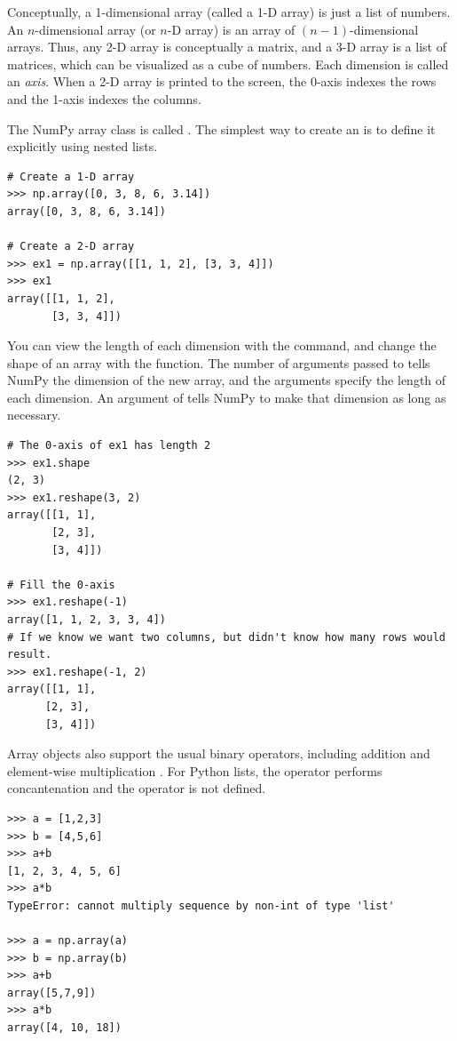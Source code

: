 Conceptually, a 1-dimensional array (called a 1-D array) is just a list of numbers. 
An $n$-dimensional array (or $n$-D array) is an array of $(n-1)$-dimensional arrays. 
Thus, any 2-D array is conceptually a matrix, and a 3-D array is a list of matrices, which can be visualized as a cube of numbers. 
Each dimension is called an \emph{axis}. 
When a 2-D array is printed to the screen, the 0-axis indexes the rows and the 1-axis indexes the columns.

The NumPy array class is called . 
The simplest way to create an  is to define it explicitly using nested lists.
\begin{lstlisting}
# Create a 1-D array
>>> np.array([0, 3, 8, 6, 3.14])
array([0, 3, 8, 6, 3.14]) 

# Create a 2-D array
>>> ex1 = np.array([[1, 1, 2], [3, 3, 4]])
>>> ex1
array([[1, 1, 2],
       [3, 3, 4]])

\end{lstlisting} 

You can view the length of each dimension with the  command, and change the shape of an array with the  function. 
The number of arguments passed to  tells NumPy the dimension of the new array, and the arguments specify the length of each dimension. 
An argument of  tells NumPy to make that dimension as long as necessary.
\begin{lstlisting}
# The 0-axis of ex1 has length 2
>>> ex1.shape
(2, 3)
>>> ex1.reshape(3, 2)
array([[1, 1],
       [2, 3],
       [3, 4]])

# Fill the 0-axis
>>> ex1.reshape(-1)
array([1, 1, 2, 3, 3, 4])
# If we know we want two columns, but didn't know how many rows would result.
>>> ex1.reshape(-1, 2)
array([[1, 1],
      [2, 3],
      [3, 4]])
\end{lstlisting}

Array objects also support the usual binary operators, including addition \li{+} and element-wise multiplication \li{*}. For Python lists, the \li{+} operator performs concantenation and the \li{*} operator is not defined.

\begin{lstlisting}
>>> a = [1,2,3]
>>> b = [4,5,6]
>>> a+b
[1, 2, 3, 4, 5, 6]
>>> a*b
TypeError: cannot multiply sequence by non-int of type 'list'

>>> a = np.array(a)
>>> b = np.array(b)
>>> a+b
array([5,7,9])
>>> a*b
array([4, 10, 18])
\end{lstlisting}


